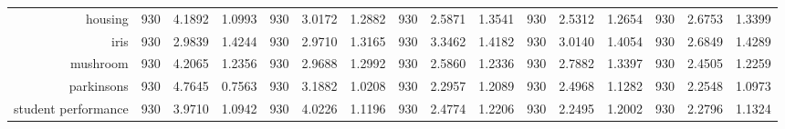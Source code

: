 \begin{table}[htbp]
{\begin{tabular}{rccccccccccccccc}
			housing                             & 930                                      & 4.1892                                                                    & 1.0993          & 930                            & 3.0172          & 1.2882          & 930                             & 2.5871          & 1.3541          & 930                             & \cellcolor[rgb]{ .776,  .937,  .808}\textcolor[rgb]{ 0,  .38,  0}{2.5312} & 1.2654          & 930                             & 2.6753                                                                             & 1.3399          \\
			iris                                & 930                                      & 2.9839                                                                    & 1.4244          & 930                            & 2.9710          & 1.3165          & 930                             & 3.3462          & 1.4182          & 930                             & 3.0140                                                                    & 1.4054          & 930                             & \cellcolor[rgb]{ .776,  .937,  .808}\textcolor[rgb]{ 0,  .38,  0}{2.6849}          & 1.4289          \\
			mushroom                            & 930                                      & 4.2065                                                                    & 1.2356          & 930                            & 2.9688          & 1.2992          & 930                             & 2.5860          & 1.2336          & 930                             & 2.7882                                                                    & 1.3397          & 930                             & \cellcolor[rgb]{ .776,  .937,  .808}\textcolor[rgb]{ 0,  .38,  0}{2.4505}          & 1.2259          \\
			parkinsons                          & 930                                      & 4.7645                                                                    & 0.7563          & 930                            & 3.1882          & 1.0208          & 930                             & 2.2957          & 1.2089          & 930                             & 2.4968                                                                    & 1.1282          & 930                             & \cellcolor[rgb]{ .776,  .937,  .808}\textcolor[rgb]{ 0,  .38,  0}{2.2548}          & 1.0973          \\
			student performance                 & 930                                      & 3.9710                                                                    & 1.0942          & 930                            & 4.0226          & 1.1196          & 930                             & 2.4774          & 1.2206          & 930                             & \cellcolor[rgb]{ .776,  .937,  .808}\textcolor[rgb]{ 0,  .38,  0}{2.2495} & 1.2002          & 930                             & 2.2796                                                                             & 1.1324          \\

\end{tabular}}
\end{table}
